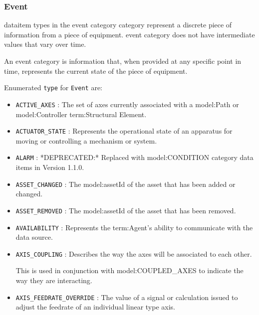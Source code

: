 \FloatBarrier

\subsubsection{Event}
  \label{sec:Event}


\gls{dataitem} types in the \gls{event category} category represent a discrete piece of information from a piece of equipment.  \gls{event category} does not have intermediate values that vary over time.

An \gls{event category} is information that, when provided at any specific point in time, represents the current state of the piece of equipment.


 Enumerated \texttt{type} for \texttt{Event} are:
\begin{itemize}

\item \texttt{ACTIVE_AXES} : The set of axes currently associated with a {model:Path} or {model:Controller} {term:Structural Element}. 

\item \texttt{ACTUATOR_STATE} : Represents the operational state of an apparatus for moving or controlling a mechanism or system. 

\item \texttt{ALARM} : *DEPRECATED:* Replaced with {model:CONDITION} category data items in Version 1.1.0. 

\item \texttt{ASSET_CHANGED} : The {model:assetId} of the asset that has been added or changed. 

\item \texttt{ASSET_REMOVED} : The {model:assetId} of the asset that has been removed. 

\item \texttt{AVAILABILITY} : Represents the {term:Agent}'s ability to communicate with the data source. 

\item \texttt{AXIS_COUPLING} : Describes the way the axes will be associated to each other. 
  
This is used in conjunction with {model:COUPLED_AXES} to indicate the way they are interacting. 

\item \texttt{AXIS_FEEDRATE_OVERRIDE} : The value of a signal or calculation issued to adjust the feedrate of an individual linear type axis. 


\end{itemize}
